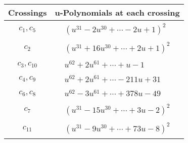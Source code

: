 \documentclass[1p]{elsarticle_modified}
\theoremstyle{definition}
\begin{document}
\begin{tabular}{m{50pt}|m{274pt}}
Crossings & \hspace{64pt}u-Polynomials at each crossing \\
\hline $$\begin{aligned}c_{1},c_{5}\end{aligned}$$&$\begin{aligned}
&(u^{31}-2 u^{30}+\cdots-2 u+1)^{2}
\end{aligned}$\\
\hline $$\begin{aligned}c_{2}\end{aligned}$$&$\begin{aligned}
&(u^{31}+16 u^{30}+\cdots+2 u+1)^{2}
\end{aligned}$\\
\hline $$\begin{aligned}c_{3},c_{10}\end{aligned}$$&$\begin{aligned}
&u^{62}+2 u^{61}+\cdots+u-1
\end{aligned}$\\
\hline $$\begin{aligned}c_{4},c_{9}\end{aligned}$$&$\begin{aligned}
&u^{62}+2 u^{61}+\cdots-211 u+31
\end{aligned}$\\
\hline $$\begin{aligned}c_{6},c_{8}\end{aligned}$$&$\begin{aligned}
&u^{62}-3 u^{61}+\cdots+378 u-49
\end{aligned}$\\
\hline $$\begin{aligned}c_{7}\end{aligned}$$&$\begin{aligned}
&(u^{31}-15 u^{30}+\cdots+3 u-2)^{2}
\end{aligned}$\\
\hline $$\begin{aligned}c_{11}\end{aligned}$$&$\begin{aligned}
&(u^{31}-9 u^{30}+\cdots+73 u-8)^{2}
\end{aligned}$\\
\hline
\end{tabular}\\~\\
\newpage\renewcommand{\arraystretch}{1}
\end{document}

